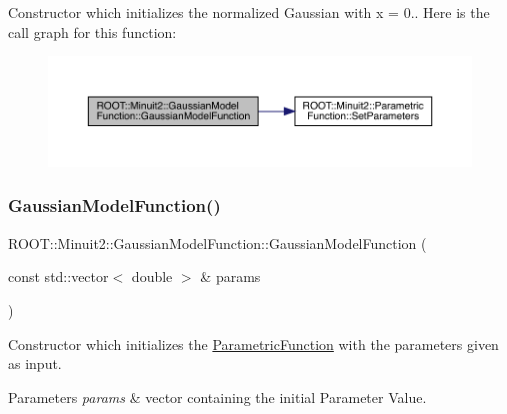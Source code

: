 Constructor which initializes the normalized Gaussian with x = 0.. Here is the call graph for this function\+:
\nopagebreak
\begin{figure}[H]
\begin{center}
\leavevmode
\includegraphics[width=350pt]{d4/df6/classROOT_1_1Minuit2_1_1GaussianModelFunction_aebecd6f3f9e7b6e7d6787f38cfc84cdc_cgraph}
\end{center}
\end{figure}
\mbox{\label{classROOT_1_1Minuit2_1_1GaussianModelFunction_ab766a76f32f2369508bde703519cc049}} 
\subsubsection{\texorpdfstring{GaussianModelFunction()}{GaussianModelFunction()}\hspace{0.1cm}{\footnotesize\ttfamily [4/4]}}
{\footnotesize\ttfamily R\+O\+O\+T\+::\+Minuit2\+::\+Gaussian\+Model\+Function\+::\+Gaussian\+Model\+Function (\begin{DoxyParamCaption}\item[{const std\+::vector$<$ double $>$ \&}]{params }\end{DoxyParamCaption})\hspace{0.3cm}{\ttfamily [inline]}}

Constructor which initializes the \mbox{\hyperlink{classROOT_1_1Minuit2_1_1ParametricFunction}{Parametric\+Function}} with the parameters given as input.


\begin{DoxyParams}{Parameters}
{\em params} & vector containing the initial Parameter Value. \\
\hline
\end{DoxyParams}
\mbox{\label{classROOT_1_1Minuit2_1_1GaussianModelFunction_abc4e84ccbc432e7706d8407c1d2efd6a}} 
